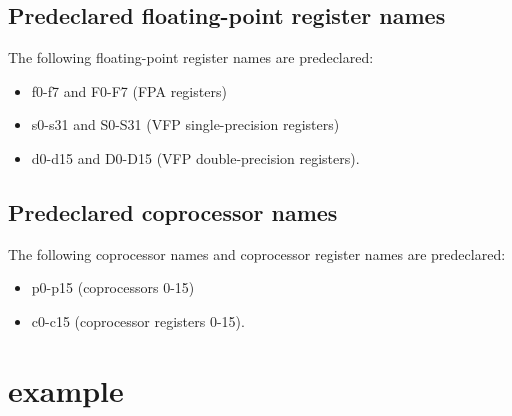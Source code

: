 \subsection{Predeclared floating-point register names}
The following floating-point register names are predeclared:
\begin{itemize}
    \item f0-f7 and F0-F7 (FPA registers)
    \item s0-s31 and S0-S31 (VFP single-precision registers)
    \item d0-d15 and D0-D15 (VFP double-precision registers).
\end{itemize}

\subsection{Predeclared coprocessor names}
The following coprocessor names and coprocessor register names are predeclared:
\begin{itemize}
    \item p0-p15 (coprocessors 0-15)
    \item c0-c15 (coprocessor registers 0-15).
\end{itemize}

\section{example}
